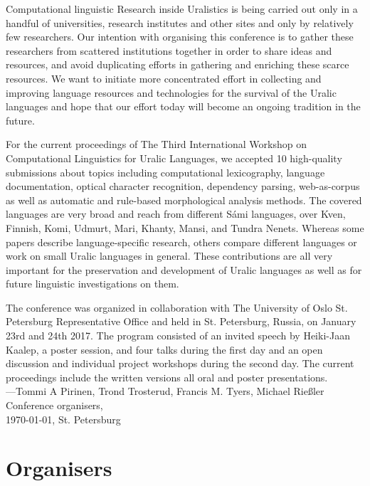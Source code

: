 \documentclass[b5paper]{book}
\newcommand\thedoi{doidoi}
\begin{document}
Computational linguistic Research inside Uralistics is being carried out only in
a handful of universities, research institutes and other sites and only by
relatively few researchers.  Our intention with organising this conference is to
gather these researchers from scattered institutions together in order to share
ideas and resources, and avoid duplicating efforts in gathering and enriching
these scarce resources. We want to initiate more concentrated effort in
collecting and improving language resources and technologies for the survival of
the Uralic languages and hope that our effort today will become an ongoing
tradition in the future.

For the current proceedings of The Third International Workshop on Computational
Linguistics for Uralic Languages, we accepted 10 high-quality submissions about
topics including computational lexicography, language documentation, optical
character recognition, dependency parsing, web-as-corpus as well as automatic
and rule-based morphological analysis methods. The covered languages are very
broad and reach from different Sámi languages, over Kven, Finnish, Komi, Udmurt,
Mari, Khanty, Mansi, and Tundra Nenets. Whereas some papers describe
language-specific research, others compare different languages or work on small
Uralic languages in general. These contributions are all very important for the
preservation and development of Uralic languages as well as for future
linguistic investigations on them.

The conference was organized in collaboration with The University of Oslo St.
Petersburg Representative Office and held in St. Petersburg, Russia, on January
23rd and 24th 2017.  The program consisted of an invited speech by Heiki-Jaan
Kaalep, a poster session, and four  talks during the first day and an open
discussion and individual project workshops during the second day.  The current
proceedings include the written versions all oral and poster presentations.\\

\noindent ---Tommi A Pirinen, Trond Trosterud, Francis M. Tyers, Michael Rießler\\
Conference organisers,\\
\today, St. Petersburg


\renewcommand\thedoi{doidoi}

\chapter*{Organisers}
\end{document}
